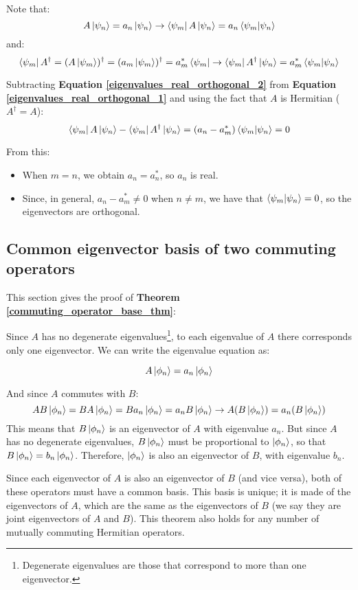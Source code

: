 Note that:
\begin{equation} \label{eigenvalues_real_orthogonal_1}
    A\ket{\psi_n} = a_n\ket{\psi_n} \to \bra{\psi_m}A\ket{\psi_n} = a_n\braket{\psi_m|\psi_n}
\end{equation}
and:
\begin{equation} \label{eigenvalues_real_orthogonal_2}
    \bra{\psi_m} A^{\dagger} = (A\ket{\psi_m})^\dagger = (a_m\ket{\psi_m})^\dagger = a_m^*\bra{\psi_m} \to \bra{\psi_m}A^\dagger\ket{\psi_n} = a_m^*\braket{\psi_m|\psi_n} 
\end{equation}

Subtracting \textbf{Equation \ref{eigenvalues_real_orthogonal_2}} from \textbf{Equation \ref{eigenvalues_real_orthogonal_1}} and using the fact that $A$ is Hermitian ($A^\dagger = A$):
\begin{equation}
    \bra{\psi_m}A\ket{\psi_n} - \bra{\psi_m}A^\dagger\ket{\psi_n} = (a_n - a_m^*)\braket{\psi_m|\psi_n} = 0
\end{equation}

From this:
\begin{itemize}
    \item When $m = n$, we obtain $a_n = a_n^*$, so $a_n$ is real.
    \item Since, in general, $a_n - a_m^* \neq 0$ when $n \neq m$, we have that $\braket{\psi_m|\psi_n} = 0$, so the eigenvectors are orthogonal.
\end{itemize}

\subsection{Common eigenvector basis of two commuting operators} \label{commuting_operator_basis}

This section gives the proof of \textbf{Theorem \ref{commuting_operator_base_thm}}:

Since $A$ has no degenerate eigenvalues\footnote{Degenerate eigenvalues are those that correspond to more than one eigenvector.}, to each eigenvalue of $A$ there corresponds only one eigenvector. We can write the eigenvalue equation as:

\begin{equation}
    A\ket{\phi_n} = a_n\ket{\phi_n}
\end{equation}

And since $A$ commutes with $B$:
\begin{equation}
    AB\ket{\phi_n} = BA\ket{\phi_n} = Ba_n\ket{\phi_n} = a_nB\ket{\phi_n}\to A (B\ket{\phi_n}) = a_n(B\ket{\phi_n})
\end{equation}
This means that $B\ket{\phi_n}$ is an eigenvector of $A$ with eigenvalue $a_n$. But since $A$ has no degenerate eigenvalues, $B\ket{\phi_n}$ must be proportional to $\ket{\phi_n}$, so that $B\ket{\phi_n} = b_n\ket{\phi_n}$. Therefore, $\ket{\phi_n}$ is also an eigenvector of $B$, with eigenvalue $b_n$.

Since each eigenvector of $A$ is also an eigenvector of $B$ (and vice versa), both of these operators must have a common basis. This basis is unique; it is made of the eigenvectors of $A$, which are the same as the eigenvectors of $B$ (we say they are joint eigenvectors of $A$ and $B$). This theorem also holds for any number of mutually commuting Hermitian operators.
